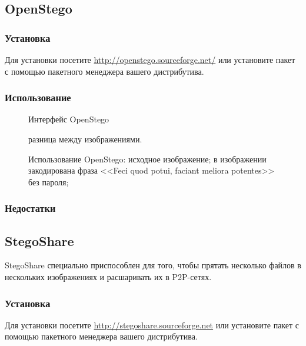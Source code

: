 \begin{enumerate}
\subsection{OpenStego}
\subsubsection{Установка}
Для установки посетите \url{http://openstego.sourceforge.net/} или установите пакет с помощью пакетного менеджера вашего дистрибутива.
\subsubsection{Использование}
\begin{figure}[h]
\caption{Интерфейс OpenStego}
\end{figure}
\begin{figure}[ht!]
\vspace{-4ex}
\centering
{}
\hspace{4ex}
\hspace{4ex}
\caption{Использование OpenStego:
 исходное изображение;
 в изображении закодирована фраза <<Feci quod potui, faciant meliora potentes>> без пароля;
} разница между изображениями.
\end{figure}
\subsubsection{Недостатки}
\subsection{StegoShare}
StegoShare специально приспособлен для того, чтобы прятать несколько файлов в нескольких изображениях и расшаривать их в P2P-сетях.
\subsubsection{Установка}
Для установки посетите \url{http://stegoshare.sourceforge.net} или установите пакет с помощью пакетного менеджера вашего дистрибутива.

\end{enumerate}
